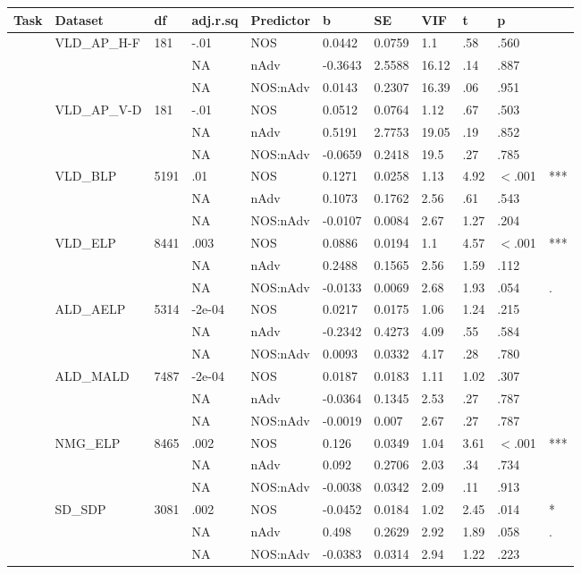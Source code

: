 \begin{table}[ht]
\centering
\begingroup\normalsize
\begin{tabular}{lllllllllll}
  \hline
Task & Dataset & df & adj.r.sq & Predictor & b & SE & VIF & t & p &  \\ 
  \hline
 & VLD\_AP\_H-F & 181 & -.01 & NOS & 0.0442 & 0.0759 & 1.1 & .58 & .560 &   \\ 
   &  &  & NA & nAdv & -0.3643 & 2.5588 & 16.12 & .14 & .887 &   \\ 
   &  &  & NA & NOS:nAdv & 0.0143 & 0.2307 & 16.39 & .06 & .951 &   \\ 
   & VLD\_AP\_V-D & 181 & -.01 & NOS & 0.0512 & 0.0764 & 1.12 & .67 & .503 &   \\ 
   &  &  & NA & nAdv & 0.5191 & 2.7753 & 19.05 & .19 & .852 &   \\ 
   &  &  & NA & NOS:nAdv & -0.0659 & 0.2418 & 19.5 & .27 & .785 &   \\ 
   & VLD\_BLP & 5191 & .01 & NOS & 0.1271 & 0.0258 & 1.13 & 4.92 & $<$.001 & *** \\ 
   &  &  & NA & nAdv & 0.1073 & 0.1762 & 2.56 & .61 & .543 &   \\ 
   &  &  & NA & NOS:nAdv & -0.0107 & 0.0084 & 2.67 & 1.27 & .204 &   \\ 
   & VLD\_ELP & 8441 & .003 & NOS & 0.0886 & 0.0194 & 1.1 & 4.57 & $<$.001 & *** \\ 
   &  &  & NA & nAdv & 0.2488 & 0.1565 & 2.56 & 1.59 & .112 &   \\ 
   &  &  & NA & NOS:nAdv & -0.0133 & 0.0069 & 2.68 & 1.93 & .054 & . \\ 
   & ALD\_AELP & 5314 & -2e-04 & NOS & 0.0217 & 0.0175 & 1.06 & 1.24 & .215 &   \\ 
   &  &  & NA & nAdv & -0.2342 & 0.4273 & 4.09 & .55 & .584 &   \\ 
   &  &  & NA & NOS:nAdv & 0.0093 & 0.0332 & 4.17 & .28 & .780 &   \\ 
   & ALD\_MALD & 7487 & -2e-04 & NOS & 0.0187 & 0.0183 & 1.11 & 1.02 & .307 &   \\ 
   &  &  & NA & nAdv & -0.0364 & 0.1345 & 2.53 & .27 & .787 &   \\ 
   &  &  & NA & NOS:nAdv & -0.0019 & 0.007 & 2.67 & .27 & .787 &   \\ 
   & NMG\_ELP & 8465 & .002 & NOS & 0.126 & 0.0349 & 1.04 & 3.61 & $<$.001 & *** \\ 
   &  &  & NA & nAdv & 0.092 & 0.2706 & 2.03 & .34 & .734 &   \\ 
   &  &  & NA & NOS:nAdv & -0.0038 & 0.0342 & 2.09 & .11 & .913 &   \\ 
   & SD\_SDP & 3081 & .002 & NOS & -0.0452 & 0.0184 & 1.02 & 2.45 & .014 & * \\ 
   &  &  & NA & nAdv & 0.498 & 0.2629 & 2.92 & 1.89 & .058 & . \\ 
   &  &  & NA & NOS:nAdv & -0.0383 & 0.0314 & 2.94 & 1.22 & .223 &   \\ 
   \hline
\end{tabular}
\endgroup
\end{table}
